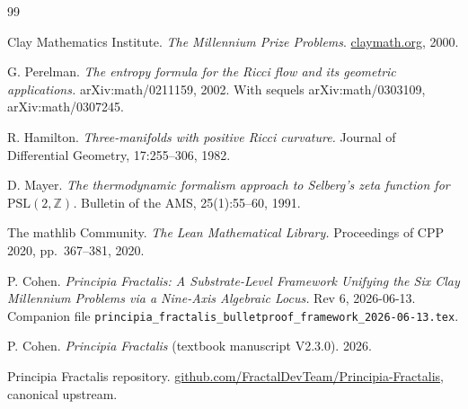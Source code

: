 \documentclass[11pt,a4paper]{amsart}
\theoremstyle{plain}
\theoremstyle{definition}
\newcommand{\Zn}{\mathbb{Z}}
\begin{document}
\begin{thebibliography}{99}

Clay Mathematics Institute. \emph{The Millennium Prize Problems}.
\href{https://www.claymath.org/millennium-problems}{claymath.org}, 2000.

G. Perelman. \emph{The entropy formula for the Ricci flow and its
geometric applications.} arXiv:math/0211159, 2002. With sequels
arXiv:math/0303109, arXiv:math/0307245.

R. Hamilton. \emph{Three-manifolds with positive Ricci curvature.}
Journal of Differential Geometry, 17:255--306, 1982.

D. Mayer. \emph{The thermodynamic formalism approach to Selberg's
zeta function for $\mathrm{PSL}(2, \Zn)$.} Bulletin of the AMS,
25(1):55--60, 1991.

The mathlib Community. \emph{The Lean Mathematical Library.}
Proceedings of CPP 2020, pp.~367--381, 2020.

P. Cohen. \emph{Principia Fractalis: A Substrate-Level Framework
Unifying the Six Clay Millennium Problems via a Nine-Axis Algebraic
Locus.} Rev 6, 2026-06-13. Companion file
\texttt{principia\_fractalis\_bulletproof\_framework\_2026-06-13.tex}.

P. Cohen. \emph{Principia Fractalis} (textbook manuscript V2.3.0).
2026.

Principia Fractalis repository.
\href{https://github.com/FractalDevTeam/Principia-Fractalis}{github.com/FractalDevTeam/Principia-Fractalis},
canonical upstream.

\end{thebibliography}
\end{document}
